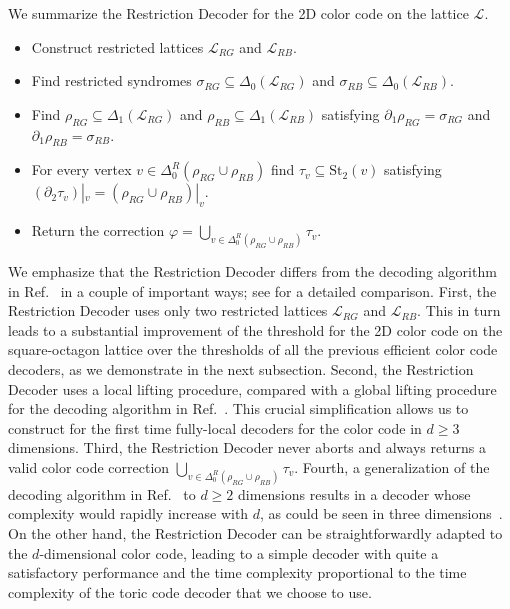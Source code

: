 \documentclass[onecolumn,letterpaper,11pt,accepted=2022-12-19]{quantumarticle}
\newcommand{\face}[2]{{\Delta_{#1}(#2)}}
\newcommand{\facex}[3]{{\Delta^{#1}_{#2}(#3)}}
\renewcommand{\star}[2]{{\mathrm{St}_{#1}(#2)}}
\newcommand{\rest}[1]{|_{#1}}
\renewcommand{\phi}{\varphi}
\theoremstyle{definition}
\theoremstyle{lemma}
\theoremstyle{theorem}
\theoremstyle{corollary}
\begin{document}
We summarize the Restriction Decoder for the 2D color code on the lattice $\mathcal{L}$.
\begin{itemize}
\item Construct restricted lattices $\mathcal{L}_{RG}$ and $\mathcal{L}_{RB}$.
\item Find restricted syndromes $\sigma_{RG}\subseteq\face 0 {\mathcal{L}_{RG}}$ and $\sigma_{RB}\subseteq\face 0 {\mathcal{L}_{RB}}$.
\item Find $\rho_{RG}\subseteq\face 1 {\mathcal{L}_{RG}}$ and $\rho_{RB}\subseteq\face 1 {\mathcal{L}_{RB}}$ satisfying $\partial_1 \rho_{RG} = \sigma_{RG}$ and $\partial_1 \rho_{RB} = \sigma_{RB}$.
\item For every vertex $v\in\facex R 0 {\rho_{RG}\cup \rho_{RB}}$ find $\tau_v\subseteq\star 2 v$ satisfying $(\partial_2 \tau_v )\rest v = (\rho_{RG}\cup \rho_{RB})\rest v$.
\item Return the correction $\phi = \bigcup_{v\in\facex R 0 {\rho_{RG}\cup\rho_{RB}}} \tau_v$.
\end{itemize}


We emphasize that the Restriction Decoder differs from the decoding algorithm in Ref.~\cite{Delfosse2014} in a couple of important ways; see \cite{Kubicathesis} for a detailed comparison.
First, the Restriction Decoder uses only two restricted lattices $\mathcal{L}_{RG}$ and $\mathcal{L}_{RB}$.
This in turn leads to a substantial improvement of the threshold for the 2D color code on the square-octagon lattice over the thresholds of all the previous efficient color code decoders, as we demonstrate in the next subsection.
Second, the Restriction Decoder uses a local lifting procedure, compared with a global lifting procedure for the decoding algorithm in Ref.~\cite{Delfosse2014}.
This crucial simplification allows us to construct for the first time fully-local decoders for the color code in $d\geq 3$ dimensions.
Third, the Restriction Decoder never aborts and always returns a valid color code correction $\bigcup_{v\in\facex R 0 {\rho_{RG}\cup\rho_{RB}}}\tau_v$.
Fourth, a generalization of the decoding algorithm in Ref.~\cite{Delfosse2014} to $d\geq 2$ dimensions results in a decoder whose complexity would rapidly increase with $d$, as could be seen in three dimensions~\cite{Aloshious2016}.
On the other hand, the Restriction Decoder can be straightforwardly adapted to the $d$-dimensional color code, leading to a simple decoder with quite a satisfactory performance and the time complexity proportional to the time complexity of the toric code decoder that we choose to use.
\end{document}
